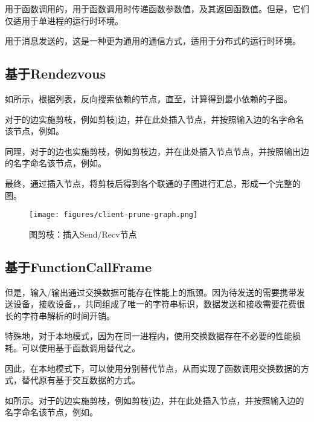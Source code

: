 \begin{content}
用于函数调用的，用于函数调用时传递函数参数值，及其返回函数值。但是，它们仅适用于单进程的运行时环境。

用于消息发送的，这是一种更为通用的通信方式，适用于分布式的运行时环境。

\subsection{基于Rendezvous}

如所示，根据列表，反向搜索依赖的节点，直至，计算得到最小依赖的子图。

对于的边实施剪枝，例如剪枝)边，并在此处插入节点，并按照输入边的名字命名该节点，例如。

同理，对于的边也实施剪枝，例如剪枝边，并在此处插入节点节点，并按照输出边的名字命名该节点，例如。

最终，通过插入节点，将剪枝后得到各个联通的子图进行汇总，形成一个完整的图。

\begin{figure}[H]
\centering
\texttt{[image: figures/client-prune-graph.png]}
\caption{图剪枝：插入Send/Recv节点}
 \label{fig:client-prune-graph}
\end{figure}

\subsection{基于FunctionCallFrame}

但是，输入/输出通过交换数据可能存在性能上的瓶颈。因为待发送的需要携带发送设备，接收设备，，共同组成了唯一的字符串标识，数据发送和接收需要花费很长的字符串解析的时间开销。

特殊地，对于本地模式，因为在同一进程内，使用交换数据存在不必要的性能损耗。可以使用基于函数调用替代之。

因此，在本地模式下，可以使用分别替代节点，从而实现了函数调用交换数据的方式，替代原有基于交互数据的方式。

如所示。对于的边实施剪枝，例如剪枝)边，并在此处插入节点，并按照输入边的名字命名该节点，例如。


\end{content}
